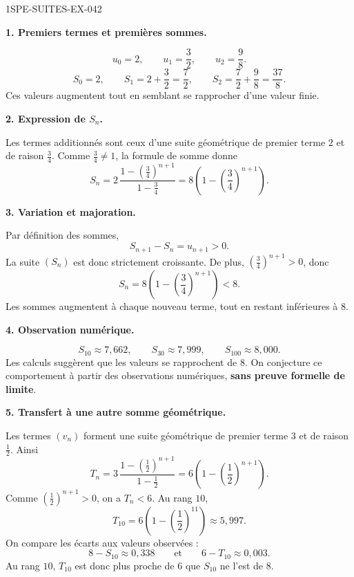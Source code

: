 \begin{corrige}{1SPE-SUITES-EX-042}

\textbf{1. Premiers termes et premières sommes.}

\[
u_0=2,\qquad u_1=\frac32,\qquad u_2=\frac98.
\]
\[
S_0=2,\qquad S_1=2+\frac32=\frac72,\qquad
S_2=\frac72+\frac98=\frac{37}{8}.
\]
Ces valeurs augmentent tout en semblant se rapprocher d'une valeur finie.

\textbf{2. Expression de $S_n$.}

Les termes additionnés sont ceux d'une suite géométrique de premier terme $2$
et de raison $\frac34$. Comme $\frac34\neq1$, la formule de somme donne
\[
S_n=2\,\frac{1-\left(\frac34\right)^{n+1}}{1-\frac34}
=8\left(1-\left(\frac34\right)^{n+1}\right).
\]

\textbf{3. Variation et majoration.}

Par définition des sommes,
\[
S_{n+1}-S_n=u_{n+1}>0.
\]
La suite $(S_n)$ est donc strictement croissante. De plus,
$\left(\frac34\right)^{n+1}>0$, donc
\[
S_n=8\left(1-\left(\frac34\right)^{n+1}\right)<8.
\]
Les sommes augmentent à chaque nouveau terme, tout en restant inférieures à
$8$.

\textbf{4. Observation numérique.}

\[
S_{10}\approx7{,}662,\qquad
S_{30}\approx7{,}999,\qquad
S_{100}\approx8{,}000.
\]
Les calculs suggèrent que les valeurs se rapprochent de $8$. On conjecture ce
comportement à partir des observations numériques, \textbf{sans preuve formelle
de limite}.

\textbf{5. Transfert à une autre somme géométrique.}

Les termes $(v_n)$ forment une suite géométrique de premier terme $3$ et de
raison $\frac12$. Ainsi
\[
T_n=3\,\frac{1-\left(\frac12\right)^{n+1}}{1-\frac12}
=6\left(1-\left(\frac12\right)^{n+1}\right).
\]
Comme $\left(\frac12\right)^{n+1}>0$, on a $T_n<6$. Au rang $10$,
\[
T_{10}=6\left(1-\left(\frac12\right)^{11}\right)
\approx5{,}997.
\]
On compare les écarts aux valeurs observées :
\[
8-S_{10}\approx0{,}338
\qquad\text{et}\qquad
6-T_{10}\approx0{,}003.
\]
Au rang $10$, $T_{10}$ est donc plus proche de $6$ que $S_{10}$ ne l'est de
$8$.

\end{corrige}

